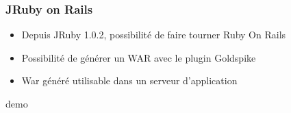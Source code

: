 \documentclass{beamer}
\begin{document}
\begin{frame}
    \frametitle{JRuby on Rails}
    \begin{itemize}
        \item Depuis JRuby 1.0.2, possibilité de faire tourner Ruby On Rails
        \item Possibilité de générer un WAR avec le plugin Goldspike
        \item War généré utilisable dans un serveur d'application
    \end{itemize}
\end{frame}

\begin{frame}
    \begin{center}
    \huge{}
    demo
    \end{center}
\end{frame}
\end{document}
